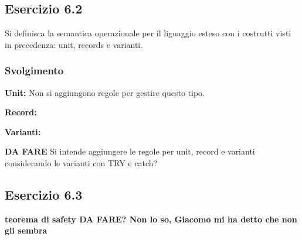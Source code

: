 \subsection*{Esercizio 6.2}
Si definisca la semantica operazionale per il liguaggio esteso con i costrutti visti in precedenza: unit, records e varianti.

\subsubsection*{Svolgimento}

\textbf{Unit:} 
Non si aggiungono regole per gestire questo tipo.

\textbf{Record:} 
\begin{prooftree}    
\end{prooftree} 

\textbf{Varianti:} 
\begin{prooftree}    
\end{prooftree}

\begin{prooftree}    
\end{prooftree}

\textbf{{\color{red} DA FARE}}
Si intende aggiungere le regole per unit, record e varianti considerando le varianti con TRY e catch?

\subsection*{Esercizio 6.3}

\textbf{{\color{red} teorema di safety DA FARE? Non lo so, Giacomo mi ha detto che non gli sembra}}
